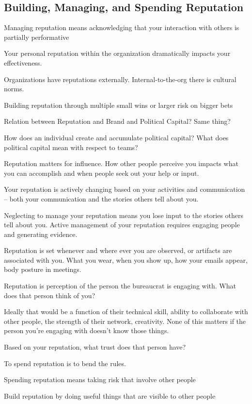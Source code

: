 \subsection{Building, Managing, and Spending Reputation\label{sec:reputation}}

Managing reputation means acknowledging that your interaction with others is partially performative

Your personal reputation within the organization dramatically impacts your effectiveness.

Organizations have reputations externally. 
Internal-to-the-org there is cultural norms. 




Building reputation through multiple small wins or larger risk on bigger bets


Relation between Reputation and Brand and Political Capital? Same thing?


How does an individual create and accumulate political capital? What does political capital mean with respect to teams?


Reputation matters for influence. How other people perceive you impacts what you can accomplish and when people seek out your help or input.

Your reputation is actively changing based on your activities and communication -- both your communication and the stories others tell about you.

Neglecting to manage your reputation means you lose input to the stories others tell about you. Active management of your reputation requires engaging people and generating evidence. 

Reputation is set whenever and where ever you are observed, or artifacts are associated with you. What you wear, when you show up, how your emails appear, body posture in meetings. 


Reputation is perception of the person the bureaucrat is engaging with.  What does that person think of you?

Ideally that would be a function of their technical skill, ability to collaborate with other people, the strength of their network, creativity. None of this matters if the person you're engaging with doesn't know those things. 

Based on your reputation, what trust does that person have? 

To spend reputation is to bend the rules. 

Spending reputation means taking risk that involve other people

Build reputation by doing useful things that are visible to other people
